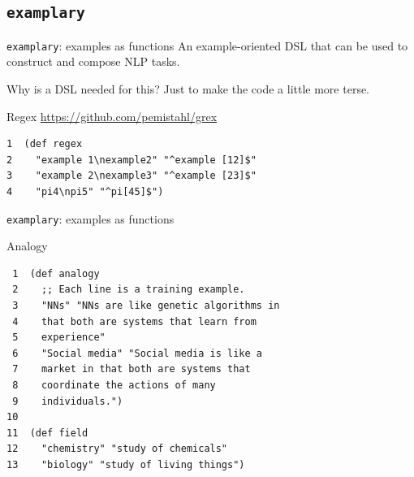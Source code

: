 \documentclass[presentation]{beamer}
\begin{document}
\subsection{\texttt{examplary}}
\label{sec:orgfb054d6}
\begin{frame}[label={sec:orgca283a0},fragile]{\texttt{examplary}: examples as functions}
 An example-oriented DSL that can be used to
construct and compose NLP tasks.

Why is a DSL needed for this? Just to make the
code a little more terse.

\begin{block}{Regex}
\url{https://github.com/pemistahl/grex}

{\footnotesize
\begin{verbatim}
1  (def regex
2    "example 1\nexample2" "^example [12]$"
3    "example 2\nexample3" "^example [23]$"
4    "pi4\npi5" "^pi[45]$")
\end{verbatim}
}
\end{block}
\end{frame}

\begin{frame}[label={sec:org69d2a5c},fragile]{\texttt{examplary}: examples as functions}
 \begin{block}{Analogy}
{\footnotesize
\begin{verbatim}
 1  (def analogy
 2    ;; Each line is a training example.
 3    "NNs" "NNs are like genetic algorithms in
 4    that both are systems that learn from
 5    experience"
 6    "Social media" "Social media is like a
 7    market in that both are systems that
 8    coordinate the actions of many
 9    individuals.")
10  
11  (def field
12    "chemistry" "study of chemicals"
13    "biology" "study of living things")
\end{verbatim}
}
\end{block}
\end{frame}
\end{document}
